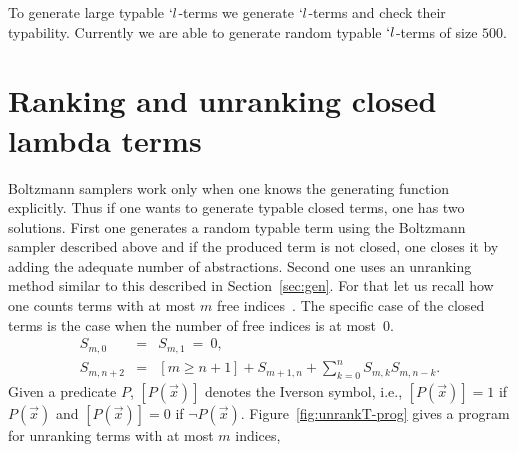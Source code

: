 \documentclass{sig-alternate}
\begin{document}
To generate large typable $`l$-terms we generate $`l$-terms and check their
typability. Currently we are able to generate random typable $`l$-terms of size
$500$.

\section{Ranking and unranking closed lambda terms}
\label{sec:closedTerm}

Boltzmann samplers work only when one knows the generating function explicitly.  Thus
if one wants to generate typable closed terms, one has two solutions.  First one
generates a random typable term using the Boltzmann sampler described above and if
the produced term is not closed, one closes it by adding the adequate number of
abstractions.  Second one uses an unranking method similar to this described in
Section~\ref{sec:gen}.  For that let us recall how one counts terms with at most $m$
free indices~\cite{DBLP:journals/corr/GrygielL14}. The specific case of the closed terms is
the case when the number of free indices is at most~$0$.
\begin{eqnarray*}
  S_{m,0} &=& S_{m,1} ~=~ 0,\label{eq:Smn}\\
  S_{m,n+2} &=& [m \ge n+1] + S_{m+1,n} + \sum_{k=0}^n S_{m,k} S_{m,n-k}.\label{eq:Smn2}
\end{eqnarray*}
Given a predicate $P$, $[P(\vec{x})]$ denotes the Iverson symbol, i.e., $[P(\vec{x})]
= 1$ if $P(\vec{x})$ and $[P(\vec{x})] = 0$ if $\neg P(\vec{x})$.
Figure~\ref{fig:unrankT-prog} gives a program for unranking terms with at most $m$ indices,
\ifICFP
\end{document}
